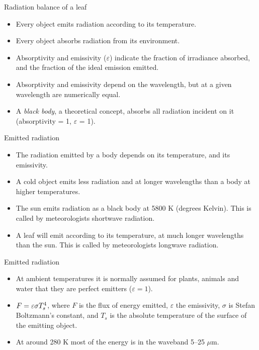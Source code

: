 \documentclass[10pt]{beamer}
\begin{document}
\begin{frame}{Radiation balance of a leaf}
    \begin{itemize}
        \item Every object emits radiation according to its
        temperature.
        \item Every object absorbs radiation from its
        environment.
        \item Absorptivity and emissivity ($\varepsilon$) indicate the fraction of
        irradiance absorbed, and the fraction of the ideal emission
        emitted.
        \item Absorptivity and emissivity depend on the wavelength,
        but at a given wavelength are numerically equal.
        \item A \emph{black body}, a theoretical concept, absorbs
        all radiation incident on it (absorptivity = 1, $\varepsilon$ = 1).
    \end{itemize}
\end{frame}

\begin{frame}{Emitted radiation}
    \begin{itemize}
        \item The radiation emitted by a body depends on its
        temperature, and its emissivity.%
        \item A cold object emits less radiation and at longer
        wavelengths than a body at higher temperatures.%
        \item The sun emits radiation as a black body at 5800 K
        (degrees Kelvin). This is called by meteorologists shortwave radiation.%
        \item A leaf will emit according to its temperature, at
        much longer wavelengths than the sun. This is called by
        meteorologists longwave radiation.
    \end{itemize}
\end{frame}

\begin{frame}{Emitted radiation}
    \begin{itemize}
        \item At ambient temperatures it is normally assumed for
        plants, animals and water that they are perfect emitters
        ($\varepsilon=1$).
        \item $\boldmath{F} = \varepsilon \sigma T_s^4$, where $F$
        is the flux of energy emitted, $\varepsilon$ the emissivity, $\sigma$
        is Stefan Boltzmann's constant, and $T_s$ is the absolute
        temperature of the surface of the emitting object.
        \item At around 280 K most of the energy is in the
        waveband 5--25 $\mu$m.
    \end{itemize}
\end{frame}
\end{document}

